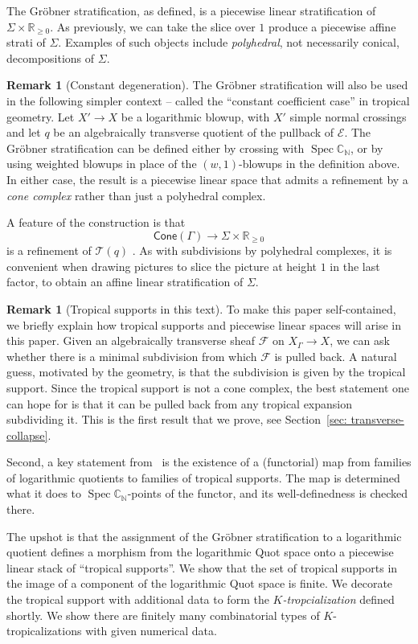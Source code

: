 \documentclass[11pt]{amsart}
\theoremstyle{definition}
\theoremstyle{definition}
\newtheorem{remark}[theorem]{Remark}
\newcommand{\RR}{\mathbb{R}}
\newcommand{\Spec}{\operatorname{Spec}}
\begin{document}
The Gr\"obner stratification, as defined, is a piecewise linear stratification of $\Sigma\times\mathbb R_{\geq 0}$. As previously, we can take the slice over $1$ produce a piecewise affine strati of $\Sigma$. Examples of such objects include {\it polyhedral}, not necessarily conical, decompositions of $\Sigma$.

\begin{remark}[Constant degeneration]
The Gr\"obner stratification will also be used in the following simpler context -- called the ``constant coefficient case'' in tropical geometry. Let $X'\to X$ be a logarithmic blowup, with $X'$ simple normal crossings and let $q$ be an algebraically transverse quotient of the pullback of $\mathcal E$. The Gr\"obner stratification can be defined either by crossing with $\Spec \mathbb C_{\mathbb N}$, or by using weighted blowups in place of the $(w,1)$-blowups in the definition above. In either case, the result is a piecewise linear space that admits a refinement by a {\it cone complex} rather than just a polyhedral complex.  
\end{remark}

A feature of the construction is that 
\[
\mathsf{Cone}(\Gamma)\to \Sigma\times  \RR_{\geq 0}
\]
is a refinement of $\mathscr T(q)$ . As with subdivisions by polyhedral complexes, it is convenient when drawing pictures to slice the picture at height $1$ in the last factor, to obtain an affine linear stratification of $\Sigma$. 

\begin{remark}[Tropical supports in this text]
To make this paper self-contained, we briefly explain how tropical supports and piecewise linear spaces will arise in this paper. Given an algebraically transverse sheaf $\mathcal F$ on $X_\Gamma\to X$, we can ask whether there is a minimal subdivision from which $\mathcal F$ is pulled back. A natural guess, motivated by the geometry, is that the subdivision is given by the tropical support. Since the tropical support is not a cone complex, the best statement one can hope for is that it can be pulled back from any tropical expansion subdividing it. This is the first result that we prove, see Section~\ref{sec: transverse-collapse}.

Second, a key statement from~\cite{Logquot} is the existence of a (functorial) map from families of logarithmic quotients to families of tropical supports. The map is determined what it does to $\Spec \mathbb C_{\mathbb N}$-points of the functor, and its well-definedness is checked there.

The upshot is that the assignment of the Gr\"obner stratification to a logarithmic quotient defines a morphism from the logarithmic Quot space onto a piecewise linear stack of ``tropical supports''. We show that the set of tropical supports in the image of a component of the logarithmic Quot space is finite. We decorate the tropical support with additional data to form the {\it $K$-tropcialization} defined shortly. We show there are  finitely many combinatorial types of $K$-tropicalizations with given numerical data. 
\end{remark}
\end{document}
